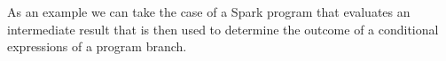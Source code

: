 %
%
%
%
As an example we can take the case of a Spark program that evaluates an intermediate result that is then used to determine the outcome of a conditional expressions of a program branch.

